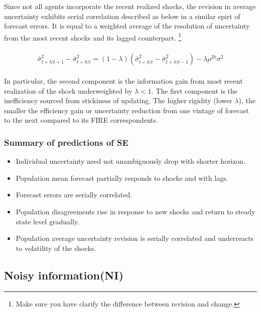 \documentclass[]{article}
\begin{document}
	Since not all agents incorporate the recent realized shocks, the revision in average uncertainty exhibits serial correlation described as below in a similar spirt of forecast errors. It is equal to a weighted average of the resolution of uncertainty from the most recent shocks and its lagged counterpart. \footnote{Make sure you have clarify the difference between revision and change.}
	
	
	\begin{eqnarray}\label{VarSERv}
		\begin{aligned}
			\bar \sigma^2_{t+h|t+1} - \bar \sigma^2_{t+h|t} = (1-\lambda)(
			\bar \sigma^2_{t+h|t} - \bar \sigma^2_{t+h|t-1}) -\lambda \rho^{2h} \sigma^2 
		\end{aligned}
	\end{eqnarray}
	
	In particular, the second component is the information gain from most recent realization of the shock underweighted by $\lambda<1$. The first component is the inefficiency sourced from stickiness of updating. The higher rigidity (lower $\lambda$), the smaller the efficiency gain or uncertainty reduction from one vintage of forecast to the next compared to its FIRE correspondents. 
	
	\subsubsection{Summary of predictions of SE}
	
	\begin{itemize}
		\item Individual uncertainty need not unambiguously drop with shorter horizon. 
		\item Population mean forecast partially responds to shocks and with lags. 
		\item Forecast errors are serially correlated. 
		\item Population disagreements rise in response to new shocks and return to steady state level gradually. 
		\item Population average uncertainty revision is serially correlated and underreacts to volatility of the shocks.
		
	\end{itemize}
	
	\subsection{Noisy information(NI)}
	
\end{document}

